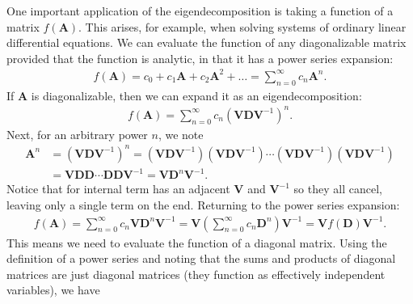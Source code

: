 One important application of the eigendecomposition is taking a function of a matrix $f(\mathbf{A})$. This arises, for example, when solving systems of ordinary linear differential equations. We can evaluate the function of any diagonalizable matrix provided that the function is analytic, in that it has a power series expansion:
\begin{align}
  f(\mathbf{A}) = c_0 + c_1 \mathbf{A} + c_2 \mathbf{A}^2 + \ldots = \sum_{n=0}^\infty c_n \mathbf{A}^n .
\end{align}
If $\mathbf{A}$ is diagonalizable, then we can expand it as an eigendecomposition:
\begin{align}
  f(\mathbf{A}) = \sum_{n=0}^\infty c_n \left( \mathbf{V} \mathbf{D} \mathbf{V}^{-1} \right)^n .
\end{align}
Next, for an arbitrary power $n$, we note
\begin{align}
  \mathbf{A}^n &= \left( \mathbf{V} \mathbf{D} \mathbf{V}^{-1} \right)^n =  
  \left( \mathbf{V} \mathbf{D} \mathbf{V}^{-1} \right) \left( \mathbf{V} \mathbf{D} \mathbf{V}^{-1} \right) \cdots \left( \mathbf{V} \mathbf{D} \mathbf{V}^{-1} \right) \left( \mathbf{V} \mathbf{D} \mathbf{V}^{-1} \right) \nonumber \\
  &= \mathbf{V} \mathbf{D} \mathbf{D} \cdots \mathbf{D} \mathbf{D} \mathbf{V}^{-1} = \mathbf{V} \mathbf{D}^n \mathbf{V}^{-1} .
\end{align}
Notice that for internal term has an adjacent $\mathbf{V}$ and $\mathbf{V}^{-1}$ so they all cancel, leaving only a single term on the end. Returning to the power series expansion:
\begin{align}
  f(\mathbf{A}) = \sum_{n=0}^\infty c_n \mathbf{V} \mathbf{D}^n \mathbf{V}^{-1} 
  = \mathbf{V} \left( \sum_{n=0}^\infty c_n \mathbf{D}^n \right) \mathbf{V}^{-1} =  \mathbf{V} f( \mathbf{D} ) \mathbf{V}^{-1}.
\end{align}
This means we need to evaluate the function of a diagonal matrix. Using the definition of a power series and noting that the sums and products of diagonal matrices are just diagonal matrices (they function as effectively independent variables), we have
